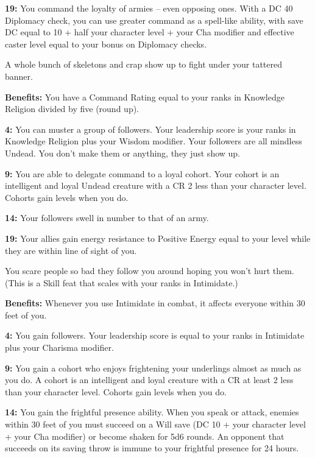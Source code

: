\textbf{19:} You command the loyalty of armies -- even opposing ones. With a DC 40 Diplomacy check, you can use greater command as a spell-like ability, with save DC equal to 10 + half your character level + your Cha modifier and effective caster level equal to your bonus on Diplomacy checks.


A whole bunch of skeletons and crap show up to fight under your tattered banner.

\textbf{Benefits:} You have a Command Rating equal to your ranks in Knowledge Religion divided by five (round up).

\textbf{4:} You can muster a group of followers. Your leadership score is your ranks in Knowledge Religion plus your Wisdom modifier. Your followers are all mindless Undead. You don't make them or anything, they just show up.

\textbf{9:} You are able to delegate command to a loyal cohort. Your cohort is an intelligent and loyal Undead creature with a CR 2 less than your character level. Cohorts gain levels when you do.

\textbf{14:} Your followers swell in number to that of an army.

\textbf{19:} Your allies gain energy resistance to Positive Energy equal to your level while they are within line of sight of you.


You scare people so bad they follow you around hoping you won't hurt them. (This is a Skill feat that scales with your ranks in Intimidate.)

\textbf{Benefits:} Whenever you use Intimidate in combat, it affects everyone within 30 feet of you.

\textbf{4:} You gain followers. Your leadership score is equal to your ranks in Intimidate plus your Charisma modifier.

\textbf{9:} You gain a cohort who enjoys frightening your underlings almost as much as you do. A cohort is an intelligent and loyal creature with a CR at least 2 less than your character level. Cohorts gain levels when you do.

\textbf{14:} You gain the frightful presence ability. When you speak or attack, enemies within 30 feet of you must succeed on a Will save (DC 10 + your character level + your Cha modifier) or become shaken for 5d6 rounds. An opponent that succeeds on its saving throw is immune to your frightful presence for 24 hours.

